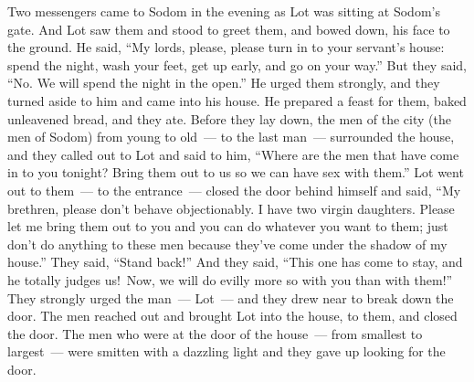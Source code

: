 \begin{inparaenum}
     Two messengers came to Sodom in the evening as Lot was sitting at Sodom's gate. And Lot saw them and stood to greet them, and bowed down, his face to the ground.%
     He said, ``My lords, please, please turn in to your servant's house: spend the night, wash your feet, get up early, and go on your way.'' But they said, ``No. We will spend the night in the open.''%
     He urged them strongly, and they turned aside to him and came into his house. He prepared a feast for them, baked unleavened bread, and they ate.%
     Before they lay down, the men of the city (the men of Sodom) from young to old~--- to the last man~--- surrounded the house,%
     and they called out to Lot and said to him, ``Where are the men that have come in to you tonight? Bring them out to us so we can have sex with them.''%
     Lot went out to them~--- to the entrance~--- closed the door behind himself%
     and said, ``My brethren, please don't behave objectionably.%
     I have two virgin daughters. Please let me bring them out to you and you can do whatever you want to them; just don't do anything to these men because they've come under the shadow of my house.''%
     They said, ``Stand back!'' And they said, ``This one has come to stay, and he totally judges us!\understood\ Now, we will do evilly more so with you than with them!'' They strongly urged the man~--- Lot~--- and they drew near to break down the door.%
     The men reached out and brought Lot into the house, to them, and closed the door.%
     The men who were at the door of the house~--- from smallest to largest~--- were smitten with a dazzling light and they gave up looking for the door.%

\end{inparaenum}
